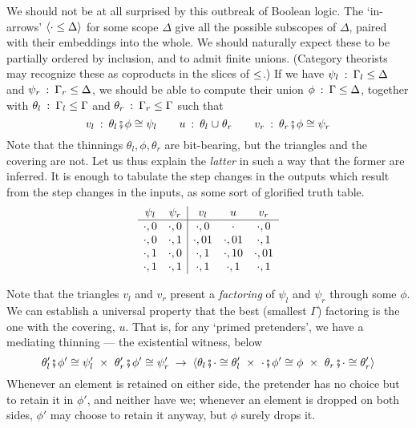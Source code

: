 \documentclass[orivec]{jfp}
\newcommand{\D}[1]{\blue{\mathbf{#1}}}
\newcommand{\C}[1]{\red{\mathrm{#1}}}
\newcommand{\hab}{\::\:}
\renewcommand{\to}{\mathrel{\blue{\rightarrow}}}
\newcommand{\XX}{\mathrel{\D{\times}}}
\newcommand{\snoc}[2]{#1\C{,}\,#2}
\newcommand{\thi}{\mathrel{\D{\le}}}
\newcommand{\cov}{\mathrel{\D{\cup}}}
\newcommand{\bO}{\C{0}}
\newcommand{\bI}{\C{1}}
\newcommand{\Tri}[3]{#1 \mathop{\D{\fatsemi}} #2 \mathrel{\D{\cong}} #3}
\newcommand{\Ex}[1]{\D{\langle}#1\D{\rangle}}
\begin{document}
We should not be at all surprised by this outbreak of Boolean logic. The `in-arrows' $\Ex{\cdot\thi\Delta}$ for some scope $\Delta$ give all the possible subscopes of $\Delta$, paired with their embeddings into the whole. We should naturally expect these to be partially ordered by inclusion, and to admit finite unions. (Category theorists may recognize these as coproducts in the slices of $\thi$.) If we have $\psi_l\hab\Gamma_l\thi\Delta$ and $\psi_r\hab\Gamma_r\thi\Delta$, we should be able to compute their union $\phi\hab\Gamma\thi\Delta$, together with $\theta_l\hab\Gamma_l\thi\Gamma$ and $\theta_r\hab\Gamma_r\thi\Gamma$ such that
\[
v_l\hab\Tri{\theta_l}\phi{\psi_l} \qquad u\hab \theta_l\cov\theta_r\qquad v_r\hab\Tri{\theta_r}\phi{\psi_r}
\]
Note that the thinnings $\theta_l,\phi,\theta_r$ are bit-bearing, but the triangles and the covering are not. Let us thus explain the \emph{latter} in such a way that the former are inferred. It is enough to tabulate the step changes in the outputs which result from the step changes in the inputs, as some sort of glorified truth table.
\[\begin{array}{cc|ccc}
\psi_l & \psi_r & v_l & u & v_r \\
\hline
\snoc\cdot\bO & \snoc\cdot\bO & \snoc\cdot\bO & \cdot & \snoc\cdot\bO \\
\snoc\cdot\bO & \snoc\cdot\bI & \snoc\cdot\bO\bI & \snoc\cdot\bO\bI & \snoc\cdot\bI \\
\snoc\cdot\bI & \snoc\cdot\bO & \snoc\cdot\bI & \snoc\cdot\bI\bO & \snoc\cdot\bO\bI \\
\snoc\cdot\bI & \snoc\cdot\bI & \snoc\cdot\bI & \snoc\cdot\bI & \snoc\cdot\bI \\
\end{array}\]

Note that the triangles $v_l$ and $v_r$ present a \emph{factoring} of $\psi_l$ and $\psi_r$ through some $\phi$. We can establish a universal property that the best (smallest $\Gamma$) factoring is the one with the covering, $u$. That is, for any `primed pretenders', we have a mediating thinning --- the existential witness, below
\[
\Tri{\theta'_l}{\phi'}{\psi'_l} \;\XX\; \Tri{\theta'_r}{\phi'}{\psi'_r}
\;\to\;
\Ex{\Tri{\theta_l}\cdot{\theta'_l}\;\XX\;
  \Tri\cdot{\phi'}{\phi}\;\XX\;
  \Tri{\theta_r}\cdot{\theta'_r}}
\]
Whenever an element is retained on either side, the pretender has no choice but to retain it in $\phi'$, and neither have we; whenever an element is dropped on both sides, $\phi'$ may choose to retain it anyway, but $\phi$ surely drops it.

\label{lastpage01}
\end{document}
